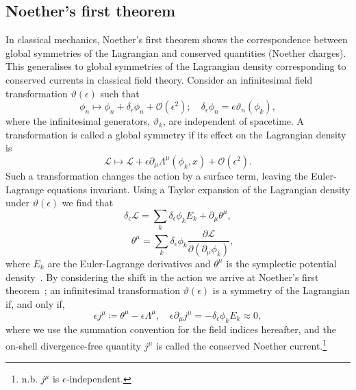 \documentclass[11pt, a4paper]{article}
\begin{document}
\subsection{Noether's first theorem}
In classical mechanics, Noether's first theorem shows the correspondence between global symmetries of 
the Lagrangian and conserved quantities (Noether charges). This generalises to global symmetries
of the Lagrangian density corresponding to conserved currents in classical field theory.
Consider an infinitesimal field transformation $\vartheta(\epsilon)$ such that
\begin{equation}
  \phi_n \mapsto \phi_n + \delta_\epsilon\phi_n + \mathcal{O}(\epsilon^2); \quad 
  \delta_\epsilon\phi_n = \epsilon\vartheta_n(\phi_k),
\end{equation}
where the infinitesimal generators, $\vartheta_k$, are independent of spacetime.
A transformation is called a global symmetry if its effect on the Lagrangian density is
\begin{equation}
  \mathcal{L} \mapsto \mathcal{L} + \epsilon\partial_\mu\Lambda^\mu(\phi_k, x)
  + \mathcal{O}(\epsilon^2).
\end{equation}
Such a transformation changes the action by a surface term, leaving the Euler-Lagrange equations
invariant. Using a Taylor expansion of the Lagrangian density under $\vartheta(\epsilon)$
we find that
\begin{equation}\label{eq:6}
  \delta_\epsilon\mathcal{L} = \sum_k{\delta_\epsilon\phi_k E_k} + \partial_\mu\theta^\mu,
\end{equation}
\begin{equation}
  \quad \theta^\mu = \sum_k{\delta_\epsilon\phi_k
  \frac{\partial \mathcal{L}}{\partial(\partial_\mu{\phi_k}) } },
\end{equation}
where $E_k$ are the Euler-Lagrange derivatives and $\theta^\mu$ is
the symplectic potential density~\cite{LocalSymm}.
By considering the shift in the action we arrive at
Noether's first theorem~\cite{NoetherTran}; an 
infinitesimal transformation $\vartheta(\epsilon)$ is a symmetry
of the Lagrangian if, and only if,
\begin{equation}\label{eq:1}
  \epsilon j^\mu \coloneq \theta^\mu - \epsilon\Lambda^\mu,
  \quad \epsilon\partial_\mu j^\mu = - \delta_\epsilon\phi_k E_k \approx 0,
\end{equation}
where we use the summation convention for the field indices hereafter,
and the on-shell divergence-free quantity $j^\mu$ is called the conserved
Noether current.\footnote{n.b. $j^\mu$ is $\epsilon$-independent.}
\end{document}

